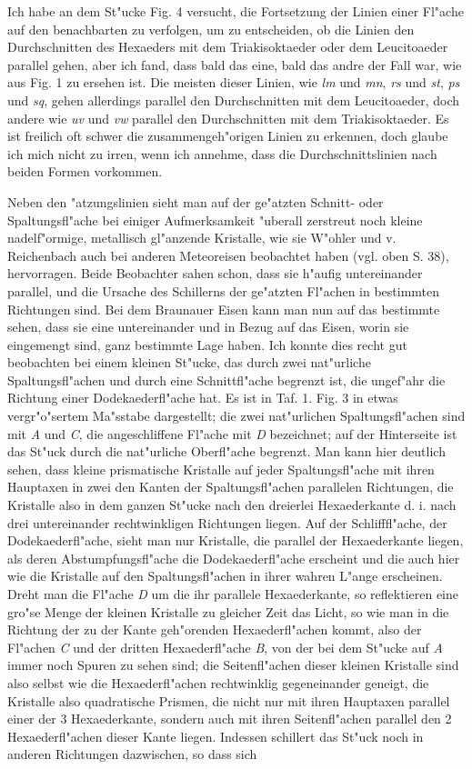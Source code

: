 \documentclass[a4paper, 11pt, oneside]{article}
\begin{document}
Ich habe an dem St"ucke Fig. 4 versucht, die Fortsetzung der Linien einer Fl"ache auf den benachbarten zu verfolgen, um zu entscheiden, ob die Linien den Durchschnitten des Hexaeders mit dem Triakisoktaeder oder dem Leucitoaeder parallel gehen, aber ich fand, dass bald das eine, bald das andre der Fall war, wie aus Fig. 1 zu ersehen ist. Die meisten dieser Linien, wie \emph{lm} und \emph{mn}, \emph{rs} und \emph{st}, \emph{ps} und \emph{sq}, gehen allerdings parallel den Durchschnitten mit dem Leucitoaeder, doch andere wie \emph{uv} und \emph{vw} parallel den Durchschnitten mit dem Triakisoktaeder. Es ist freilich oft schwer die zusammengeh"origen Linien zu erkennen, doch glaube ich mich nicht zu irren, wenn ich annehme, dass die Durchschnittslinien nach beiden Formen vorkommen.

Neben den "atzungslinien sieht man auf der ge"atzten Schnitt- oder Spaltungsfl"ache bei einiger Aufmerksamkeit "uberall zerstreut noch kleine nadelf"ormige, metallisch gl"anzende Kristalle, wie sie W"ohler und v. Reichenbach auch bei anderen Meteoreisen beobachtet haben (vgl. oben S. 38), hervorragen. Beide Beobachter sahen schon, dass sie h"aufig untereinander parallel, und die Ursache des Schillerns der ge"atzten Fl"achen in bestimmten Richtungen sind. Bei dem Braunauer Eisen kann man nun auf das bestimmte sehen, dass sie eine untereinander und in Bezug auf das Eisen, worin sie eingemengt sind, ganz bestimmte Lage haben. Ich konnte dies recht gut beobachten bei einem kleinen St"ucke, das durch zwei nat"urliche Spaltungsfl"achen und durch eine Schnittfl"ache begrenzt ist, die ungef"ahr die Richtung einer Dodekaederfl"ache hat. Es ist in Taf. 1. Fig. 3 in etwas vergr"o"sertem Ma"sstabe dargestellt; die zwei nat"urlichen Spaltungsfl"achen sind mit \emph{A} und \emph{C}, die angeschliffene Fl"ache mit \emph{D} bezeichnet; auf der Hinterseite ist das St"uck durch die nat"urliche Oberfl"ache begrenzt. Man kann hier deutlich sehen, dass kleine prismatische Kristalle auf jeder Spaltungsfl"ache mit ihren Hauptaxen in zwei den Kanten der Spaltungsfl"achen parallelen Richtungen, die Kristalle also in dem ganzen St"ucke nach den dreierlei Hexaederkante d. i. nach drei untereinander rechtwinkligen Richtungen liegen. Auf der Schlifffl"ache, der Dodekaederfl"ache, sieht man nur Kristalle, die parallel der Hexaederkante liegen, als deren Abstumpfungsfl"ache die Dodekaederfl"ache erscheint und die auch hier wie die Kristalle auf den Spaltungsfl"achen in ihrer wahren L"ange erscheinen. Dreht man die Fl"ache \emph{D} um die ihr parallele Hexaederkante, so reflektieren eine gro"se Menge der kleinen Kristalle zu gleicher Zeit das Licht, so wie man in die Richtung der zu der Kante geh"orenden Hexaederfl"achen kommt, also der Fl"achen \emph{C} und der dritten Hexaederfl"ache \emph{B}, von der bei dem St"ucke auf \emph{A} immer noch Spuren zu sehen sind; die Seitenfl"achen dieser kleinen Kristalle sind also selbst wie die Hexaederfl"achen rechtwinklig gegeneinander geneigt, die Kristalle also quadratische Prismen, die nicht nur mit ihren Hauptaxen parallel einer der 3 Hexaederkante, sondern auch mit ihren Seitenfl"achen parallel den 2 Hexaederfl"achen dieser Kante liegen. Indessen schillert das St"uck noch in anderen Richtungen dazwischen, so dass sich 
\end{document}
